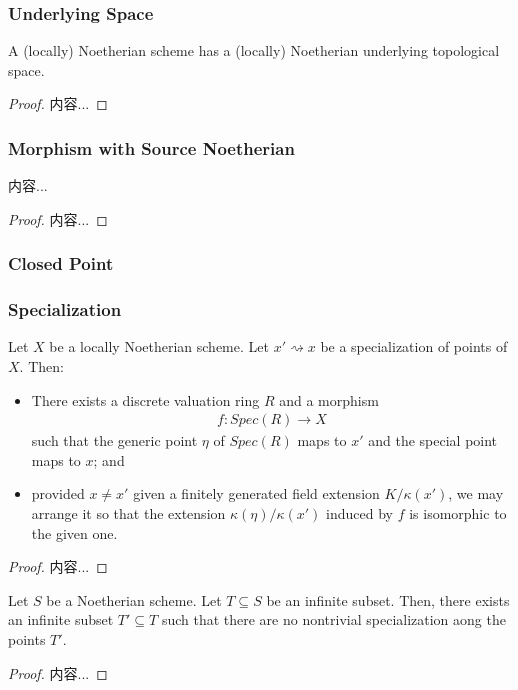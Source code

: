 \documentclass[Total.tex]{subfiles}
\begin{document}
			\subsubsection{Underlying Space}
			\begin{lemma}
				A (locally) Noetherian scheme has a (locally) Noetherian underlying topological space.
			\end{lemma}
			\begin{proof}
				内容...
			\end{proof}
			\subsubsection{Morphism with Source Noetherian}
				\begin{lemma}
					内容...
				\end{lemma}
				\begin{proof}
					内容...
				\end{proof}
			\subsubsection{Closed Point}
			\subsubsection{Specialization}
				\begin{lemma}
					Let $X$ be a locally Noetherian scheme. Let $x'\rightsquigarrow x$ be a specialization of points of $X$. Then:
					\begin{itemize}
						\item There exists a discrete valuation ring $R$ and a morphism 
						\begin{gather*}
							f:Spec(R)\rightarrow X
						\end{gather*}
						such that the generic point $\eta$ of $Spec(R)$ maps to $x'$ and the special point maps to $x$; and
						\item provided $x\not=x'$ given a finitely generated field extension $K/\kappa(x')$, we may arrange it so that the extension $\kappa(\eta)/\kappa(x')$ induced by $f$ is isomorphic to the given one.
					\end{itemize}
				\end{lemma}
				\begin{proof}
					内容...
				\end{proof}
				
				\begin{lemma}
					Let $S$ be a Noetherian scheme. Let $T\subseteq S$ be an infinite subset. Then, there exists an infinite subset $T'\subseteq T$ such that there are no nontrivial specialization aong the points $T'$.
				\end{lemma}
				\begin{proof}
					内容...
				\end{proof}
				
\end{document}
